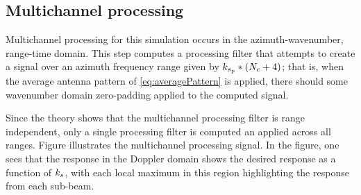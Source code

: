 \subsection{Multichannel processing}
Multichannel processing for this simulation occurs in the azimuth-wavenumber, range-time domain. This step computes a processing filter that attempts to create a signal over an azimuth frequency range given by $k_{s_p}*(N_c + 4)$; that is, when the average antenna pattern of \eqref{eq:averagePattern} is applied, there should some wavenumber domain zero-padding applied to the computed signal.
\par
Since the theory shows that the multichannel processing filter is range independent, only a single processing filter is computed an applied across all ranges. Figure  illustrates the multichannel processing signal. In the figure, one sees that the response in the Doppler domain shows the desired response as a function of $k_{s}$, with each local maximum in this region highlighting the response from each sub-beam.
